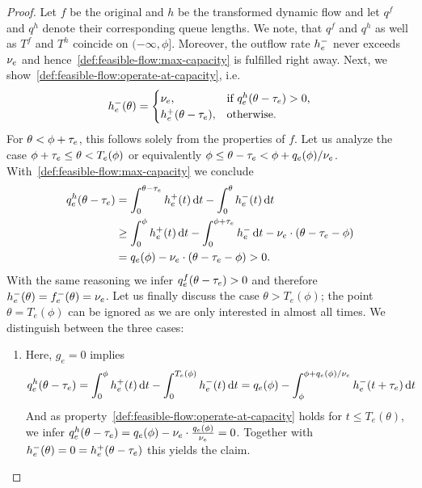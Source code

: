 \begin{proof}
    Let $f$ be the original and $h$ be the transformed dynamic flow and let $q^f$ and $q^h$ denote their corresponding queue lengths.
    We note, that $q^f$ and $q^h$ as well as $T^f$ and $T^h$ coincide on $(-\infty, \phi]$.
    Moreover, the outflow rate $\outfl[h]_e$ never exceeds $\capa_e$ and hence~\ref{def:feasible-flow:max-capacity} is fulfilled right away.
    Next, we show~\ref{def:feasible-flow:operate-at-capacity}, i.e. \[
        \outfl[h]_e(\theta) = \begin{cases}
            \capa_e, &\text{if $q^h_e(\theta - \transit_e) > 0$,} \\
            \infl[h]_e(\theta - \transit_e), &\text{otherwise.}
        \end{cases}
    \]
    For $\theta < \phi + \transit_e$, this follows solely from the properties of $f$.
    Let us analyze the case $\phi + \transit_e \leq \theta < T_e(\phi)$ or equivalently $\phi  \leq \theta - \transit_e < \phi + q_e(\phi) /\capa_e$.
    With~\ref{def:feasible-flow:max-capacity} we conclude \begin{align*}
        q_e^h(\theta - \transit_e)
        &= \int_0^{\theta-\transit_e} \infl[h]_e(t) \diff t - \int_0^{\theta} \outfl[h]_e(t) \diff t \\
        &\geq \int_0^{\phi} \infl[h]_e(t)\diff t - \int_0^{\phi + \transit_e} \outfl[h]_e \diff t
        - \capa_e\cdot (\theta - \transit_e - \phi)\\
        & = q_e(\phi) - \capa_e\cdot(\theta - \transit_e - \phi) > 0.
    \end{align*}
    With the same reasoning we infer $q_e^f(\theta - \transit_e) > 0$ and therefore $\outfl[h]_e(\theta) = \outfl[f]_e(\theta) = \capa_e$.
    Let us finally discuss the case $\theta > T_e(\phi)$;
    the point $\theta = T_e(\phi)$ can be ignored as we are only interested in almost all times.
    We distinguish between the three cases:
    \begin{enumerate}[label=\textbf{Case \Roman*.}, wide=0.5em]
        \item Here, $g_e = 0$ implies \begin{align*}
            q_e^h(\theta - \transit_e)
            = \int_0^\phi \infl[h]_e(t) \diff t - \int_0^{T_e(\phi)} \outfl[h]_e(t)\diff t
            = q_e(\phi) - \int_\phi^{\phi + q_e(\phi)/\capa_e} \outfl[h]_e(t + \transit_e)\diff t
        \end{align*}
        And as property~\ref{def:feasible-flow:operate-at-capacity} holds for $t\leq T_e(\theta)$, we infer $q_e^h(\theta - \transit_e) = q_e(\phi) - \capa_e \cdot \frac{q_e(\phi)}{\capa_e} = 0$.
        Together with $\outfl[h]_e(\theta) = 0 = \infl[h]_e(\theta - \transit_e)$ this yields the claim.


\end{enumerate}
\end{proof}
